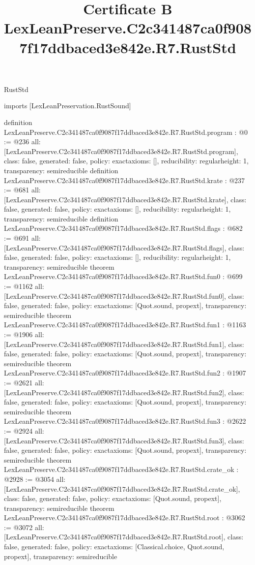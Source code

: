 \begin{lexlean}{RustStd}
\title{Certificate B LexLeanPreserve.C2c341487ca0f9087f17ddbaced3e842e.R7.RustStd}
\begin{coremodule}
imports [LexLeanPreservation.RustSound]

definition LexLeanPreserve.C2c341487ca0f9087f17ddbaced3e842e.R7.RustStd.program : @0 := @236 {
  all: [LexLeanPreserve.C2c341487ca0f9087f17ddbaced3e842e.R7.RustStd.program],
  class: false,
  generated: false,
  policy: exact{axioms: []},
  reducibility: regular{height: 1},
  transparency: semireducible
}
definition LexLeanPreserve.C2c341487ca0f9087f17ddbaced3e842e.R7.RustStd.krate : @237 := @681 {
  all: [LexLeanPreserve.C2c341487ca0f9087f17ddbaced3e842e.R7.RustStd.krate],
  class: false,
  generated: false,
  policy: exact{axioms: []},
  reducibility: regular{height: 1},
  transparency: semireducible
}
definition LexLeanPreserve.C2c341487ca0f9087f17ddbaced3e842e.R7.RustStd.flags : @682 := @691 {
  all: [LexLeanPreserve.C2c341487ca0f9087f17ddbaced3e842e.R7.RustStd.flags],
  class: false,
  generated: false,
  policy: exact{axioms: []},
  reducibility: regular{height: 1},
  transparency: semireducible
}
theorem LexLeanPreserve.C2c341487ca0f9087f17ddbaced3e842e.R7.RustStd.fun0 : @699 := @1162 {
  all: [LexLeanPreserve.C2c341487ca0f9087f17ddbaced3e842e.R7.RustStd.fun0],
  class: false,
  generated: false,
  policy: exact{axioms: [Quot.sound, propext]},
  transparency: semireducible
}
theorem LexLeanPreserve.C2c341487ca0f9087f17ddbaced3e842e.R7.RustStd.fun1 : @1163 := @1906 {
  all: [LexLeanPreserve.C2c341487ca0f9087f17ddbaced3e842e.R7.RustStd.fun1],
  class: false,
  generated: false,
  policy: exact{axioms: [Quot.sound, propext]},
  transparency: semireducible
}
theorem LexLeanPreserve.C2c341487ca0f9087f17ddbaced3e842e.R7.RustStd.fun2 : @1907 := @2621 {
  all: [LexLeanPreserve.C2c341487ca0f9087f17ddbaced3e842e.R7.RustStd.fun2],
  class: false,
  generated: false,
  policy: exact{axioms: [Quot.sound, propext]},
  transparency: semireducible
}
theorem LexLeanPreserve.C2c341487ca0f9087f17ddbaced3e842e.R7.RustStd.fun3 : @2622 := @2924 {
  all: [LexLeanPreserve.C2c341487ca0f9087f17ddbaced3e842e.R7.RustStd.fun3],
  class: false,
  generated: false,
  policy: exact{axioms: [Quot.sound, propext]},
  transparency: semireducible
}
theorem LexLeanPreserve.C2c341487ca0f9087f17ddbaced3e842e.R7.RustStd.crate_ok : @2928 := @3054 {
  all: [LexLeanPreserve.C2c341487ca0f9087f17ddbaced3e842e.R7.RustStd.crate_ok],
  class: false,
  generated: false,
  policy: exact{axioms: [Quot.sound, propext]},
  transparency: semireducible
}
theorem LexLeanPreserve.C2c341487ca0f9087f17ddbaced3e842e.R7.RustStd.root : @3062 := @3072 {
  all: [LexLeanPreserve.C2c341487ca0f9087f17ddbaced3e842e.R7.RustStd.root],
  class: false,
  generated: false,
  policy: exact{axioms: [Classical.choice, Quot.sound, propext]},
  transparency: semireducible
}


\end{coremodule}
\end{lexlean}
